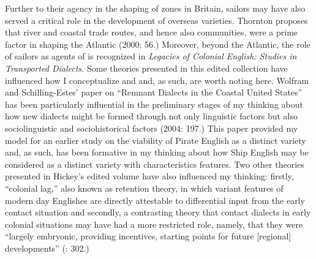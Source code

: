   Further to their agency in the shaping of  zones in Britain, sailors may have also served a critical role in the development of overseas varieties. Thornton proposes that river and coastal trade routes, and hence also  communities, were a prime factor in shaping the  Atlantic (2000: 56.) Moreover, beyond the Atlantic, the role of sailors as agents of  is recognized in  \textit{Legacies of Colonial English: Studies in Transported Dialects.} Some theories presented in this edited collection have influenced how I conceptualize  and  and, as such, are worth noting here. Wolfram and Schilling-Estes’ paper on “Remnant Dialects in the Coastal United States” has been particularly influential in the preliminary stages of my thinking about how new dialects might be formed through not only linguistic factors but also sociolinguistic and sociohistorical factors (2004: 197.) This paper provided my model for an earlier study on the viability of  Pirate English as a distinct variety \citep{Delgado2013} and, as such, has been formative in my thinking about how Ship English may be considered as a distinct variety with characteristics features. Two other theories presented in Hickey’s edited volume have also influenced my thinking: firstly, “colonial lag,” also known as retention theory, in which variant features of modern day Englishes are directly attestable to differential input from the early contact situation \citep[8,]{Hickey2004} and secondly, a contrasting theory that contact dialects in early colonial situations may have had a more restricted role, namely, that they were “largely embryonic, providing incentives, starting points for future [regional] developments” (\citealt{Schneider2004}: 302.) 

